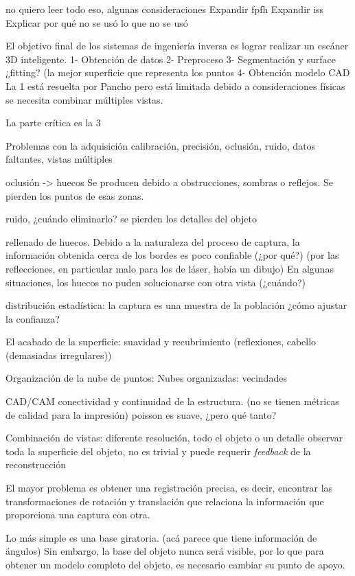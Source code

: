 no quiero leer todo eso, algunas consideraciones
	Expandir fpfh
	Expandir iss
	Explicar por qué no se usó lo que no se usó


El objetivo final de los sistemas de ingeniería inversa
es lograr realizar un escáner 3D inteligente.
1- Obtención de datos
2- Preproceso
3- Segmentación y surface ¿fitting? (la mejor superficie que representa los puntos
4- Obtención modelo CAD
La 1 está resuelta por Pancho
	pero está limitada debido a consideraciones físicas
	se necesita combinar múltiples vistas.

La parte crítica es la 3

	Problemas con la adquisición
		calibración, precisión, oclusión, ruido, datos faltantes, vistas múltiples

		oclusión -> huecos
			Se producen debido a obstrucciones, sombras o reflejos.
			Se pierden los puntos de esas zonas.

		ruido, ¿cuándo eliminarlo?
			se pierden los detalles del objeto

		rellenado de huecos.
			Debido a la naturaleza del proceso de captura,
			la información obtenida cerca de los bordes es poco confiable (¿por qué?)
				(por las reflecciones, en particular malo para los de láser, había un dibujo)
			En algunas situaciones, los huecos no puden solucionarse con otra vista (¿cuándo?) 

		distribución estadística: la captura es una muestra de la población
			¿cómo ajustar la confianza?

		El acabado de la superficie:
			suavidad y recubrimiento (reflexiones, cabello (demasiadas irregulares))


	Organización de la nube de puntos:
		Nubes organizadas: vecindades	

	CAD/CAM conectividad y continuidad de la estructura.
		(no se tienen métricas de calidad para la impresión)
		poisson es suave, ¿pero qué tanto?

	Combinación de vistas:
		diferente resolución, todo el objeto o un detalle
		observar toda la superficie del objeto, no es trivial y puede requerir \emph{feedback}
		de la reconstrucción

	El mayor problema es obtener una registración precisa, es decir,
	encontrar las transformaciones de rotación y translación que relaciona la
	información que proporciona una captura con otra.

	Lo más simple es una base giratoria. (acá parece que tiene información de ángulos)
	Sin embargo, la base del objeto nunca
	será visible, por lo que para obtener un modelo completo del objeto, es
	necesario cambiar su punto de apoyo.

